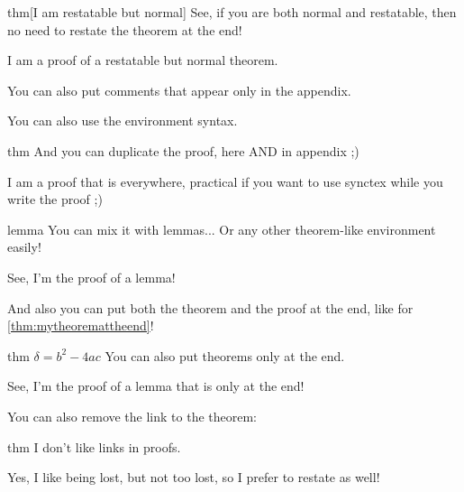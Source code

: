 \documentclass{article}
\begin{document}
\begin{theoremEnd}{thm}[I am restatable but normal]
  See, if you are both normal and restatable, then no need to restate the theorem at the end!
\end{theoremEnd}
\begin{proofEnd}
  I am a proof of a restatable but normal theorem.  
\end{proofEnd}

You can also put comments that appear only in the appendix.


\begin{textAtEnd}
  You can also use the environment syntax.
\end{textAtEnd}


\begin{theoremEnd}{thm}
  And you can duplicate the proof, here AND in appendix ;)  
\end{theoremEnd}
\begin{proofEnd}
  I am a proof that is everywhere, practical if you want to use synctex while you write the proof ;)
\end{proofEnd}

\begin{theoremEnd}{lemma}
  You can mix it with lemmas... Or any other theorem-like environment easily!  
\end{theoremEnd}
\begin{proofEnd}
  See, I'm the proof of a lemma!  
\end{proofEnd}

And also you can put both the theorem and the proof at the end, like for \autoref{thm:mytheoremattheend}!


\begin{theoremEnd}{thm}
  \label{thm:mytheoremattheend}
  $\delta = b^2-4ac$
  You can also put theorems only at the end.  
\end{theoremEnd}
\begin{proofEnd}
  See, I'm the proof of a lemma that is only at the end!
\end{proofEnd}


You can also remove the link to the theorem:
\begin{theoremEnd}{thm}
  I don't like links in proofs.  
\end{theoremEnd}
\begin{proofEnd}
  Yes, I like being lost, but not too lost, so I prefer to restate as well!
\end{proofEnd}
\end{document}
